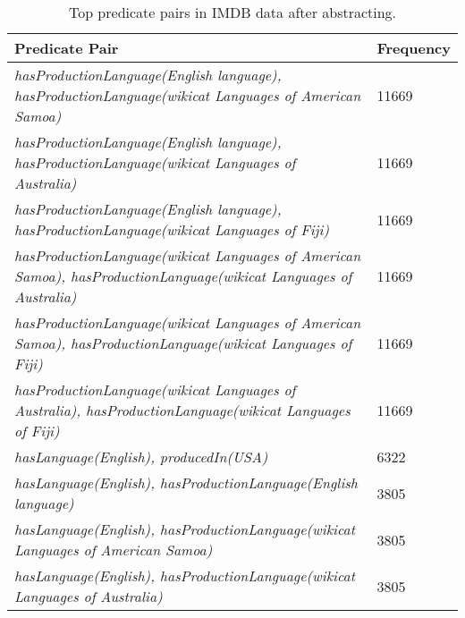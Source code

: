\documentclass{acm_proc_article-sp}
\begin{document}
\begin{table}
\caption{Top predicate pairs in IMDB data after abstracting.}
\label{table4}
\begin{center}
\begin{tabular}{ |p{6cm}|p{1.5cm}| } 
\hline
Predicate Pair & Frequency\\
\hline
\textit{hasProductionLanguage(English language), hasProductionLanguage(wikicat Languages of American Samoa)} & 11669 \\
\hline
\textit{hasProductionLanguage(English language), hasProductionLanguage(wikicat Languages of Australia)} & 11669 \\
\hline
\textit{hasProductionLanguage(English language), hasProductionLanguage(wikicat Languages of Fiji)} & 11669 \\
\hline
\textit{hasProductionLanguage(wikicat Languages of American Samoa), hasProductionLanguage(wikicat Languages of Australia)} & 11669 \\
\hline
\textit{hasProductionLanguage(wikicat Languages of American Samoa), hasProductionLanguage(wikicat Languages of Fiji)} & 11669 \\
\hline
\textit{hasProductionLanguage(wikicat Languages of Australia), hasProductionLanguage(wikicat Languages of Fiji)} & 11669 \\
\hline
\textit{hasLanguage(English), producedIn(USA)} & 6322 \\
\hline
\textit{hasLanguage(English), hasProductionLanguage(English language)} & 3805 \\
\hline
\textit{hasLanguage(English), hasProductionLanguage(wikicat Languages of American Samoa)} & 3805 \\
\hline
\textit{hasLanguage(English), hasProductionLanguage(wikicat Languages of Australia)} & 3805 \\
\hline
\end{tabular}
\end{center}
\end{table}
\end{document}
